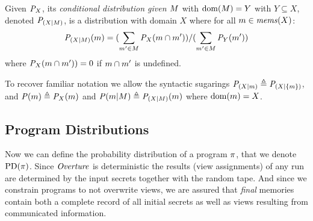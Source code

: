 \begin{definition}
  Given ${\mathit{P}}_{X}$, its \emph{conditional distribution given
  $M$} with $\mathrm{dom}(M) = Y$ with $Y \subseteq X$, denoted
  $\mathit{P}_{({X}|{M})}$, is a distribution with domain $X$ where for all
  $m \in \mathit{mems}(X)$:
  $$
  \mathit{P}_{({X}|{M})}(m) =
  (\sum_{m' \in M} {\mathit{P}}_{X}(m \cap m')) /
  (\sum_{m' \in M} {\mathit{P}}_{Y}(m'))
  $$
  where ${\mathit{P}}_{X}(m \cap m')) = 0$ if $m \cap m'$ is undefined.
\end{definition}
To recover familiar notation we allow the syntactic
sugarings $\mathit{P}_{({X}|{m})}  \triangleq \mathit{P}_{({X}|{\{ m\}})}$, and
$\mathit{P}(m)  \triangleq {\mathit{P}}_{X}(m)$ and $\mathit{P}(m|M) \triangleq
\mathit{P}_{({X}|{M})}(m)$ where $\mathrm{dom}(m) = X$.

\subsection{Program Distributions}
Now we can define the probability distribution of a program $\pi$,
that we denote $\mathrm{PD}(\pi)$. Since $\mathit{Overture}$ is deterministic the
results (view assignments) of any run are determined by the input
secrets together with the random tape. And since we constrain programs
to not overwrite views, we are assured that \emph{final} memories
contain both a complete record of all initial secrets as well as views
resulting from communicated information.

